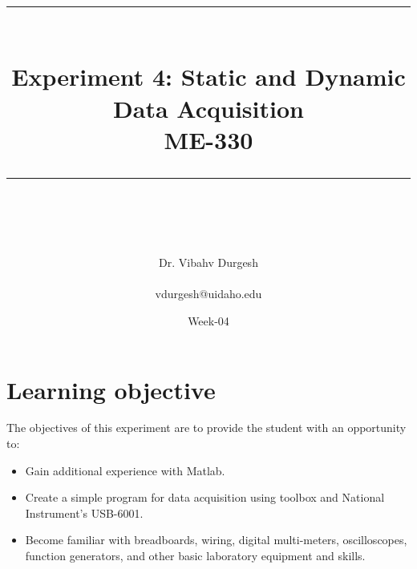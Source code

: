 \documentclass{article} %
\newcommand{\HRule}{\rule{\linewidth}{0.5mm}} %
\begin{document}


\title{
\begin{center}
\HRule \\[0.4cm]
{\Huge \bfseries Experiment 4: Static and Dynamic Data Acquisition \\[0.5cm] \Large ME-330}\\[0.4cm] %
\HRule \\[1.5cm]
\end{center}
}
\author{\Huge Dr. Vibahv Durgesh \\ \\ \LARGE vdurgesh@uidaho.edu \\[2cm]} %
\date{Week-04} %
\maketitle

\tableofcontents

\clearpage



\section{Learning objective}
The objectives of this experiment are to provide the student with an opportunity to:

\begin{itemize}
\item Gain additional experience with Matlab.
\item Create a simple program for data acquisition using toolbox and National Instrument’s USB-6001.
\item Become familiar with breadboards, wiring, digital multi-meters, oscilloscopes, function generators, and other basic laboratory equipment and skills.
\end{itemize}
\end{document}
